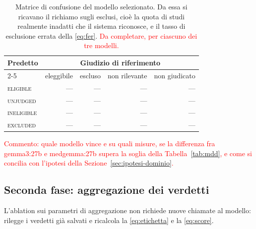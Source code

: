 \documentclass[pdflatex,sn-mathphys-num]{sn-jnl}
\theoremstyle{thmstyleone}
\theoremstyle{thmstyletwo}
\theoremstyle{thmstylethree}
\newcommand{\ev}[1]{\textcolor{red}{#1}}
\begin{document}
\begin{table}[H]
\centering
\begin{tabular}{lrrrr}
\toprule
\multirow{2}{*}{Predetto} & \multicolumn{4}{c}{Giudizio di riferimento} \\
\cmidrule(lr){2-5}
 & eleggibile & escluso & non rilevante & non giudicato \\
\midrule
\textsc{eligible}   & --- & --- & --- & --- \\
\textsc{unjudged}   & --- & --- & --- & --- \\
\textsc{ineligible} & --- & --- & --- & --- \\
\textsc{excluded}   & --- & --- & --- & --- \\
\bottomrule
\end{tabular}
\caption{Matrice di confusione del modello selezionato. Da essa si ricavano il richiamo sugli esclusi, cioè la quota di studi realmente inadatti che il sistema riconosce, e il tasso di esclusione errata della \eqref{eq:fer}. \ev{Da completare, per ciascuno dei tre modelli.}}
\label{tab:confusione}
\end{table}

\ev{Commento: quale modello vince e su quali misure, se la differenza fra gemma3:27b e medgemma:27b supera la soglia della Tabella~\ref{tab:mdd}, e come si concilia con l'ipotesi della Sezione~\ref{sec:ipotesi-dominio}.}

\subsection{Seconda fase: aggregazione dei verdetti}\label{sec:res-aggregazione}

L'ablation sui parametri di aggregazione non richiede nuove chiamate al modello: rilegge i verdetti già salvati e ricalcola la \eqref{eq:etichetta} e la \eqref{eq:score}.
\end{document}

